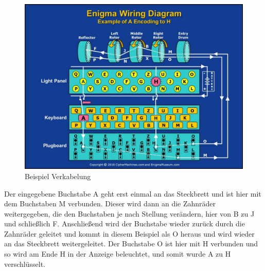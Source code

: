 \begin{figure}[H]
\centering
\includegraphics[scale=0.3]{Enigma_Maschine_Beispiel.jpg}
\caption{Beispiel Verkabelung}
\label{fig:enigma}
\end{figure}

Der eingegebene Buchstabe A geht erst einmal an das Steckbrett und ist hier mit dem Buchstaben M verbunden. Dieser wird dann an die Zahnräder weitergegeben, die den Buchstaben je nach Stellung verändern, hier von B zu J und schließlich F. Anschließend wird der Buchstabe wieder zurück durch die Zahnräder geleitet und kommt in diesem Beispiel als O heraus und wird wieder an das Steckbrett weitergeleitet. Der Buchstabe O ist hier mit H verbunden und so wird am Ende H in der Anzeige beleuchtet, und somit wurde A zu H verschlüsselt.

